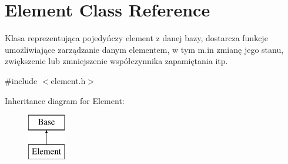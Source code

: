 \hypertarget{class_element}{}\section{Element Class Reference}
\label{class_element}


Klasa reprezentująca pojedyńczy element z danej bazy, dostarcza funkcje umożliwiające zarządzanie danym elementem, w tym m.\+in zmianę jego stanu, zwiększenie lub zmniejszenie współczynnika zapamiętania itp.  




{\ttfamily \#include $<$element.\+h$>$}

Inheritance diagram for Element\+:\begin{figure}[H]
\begin{center}
\leavevmode
\includegraphics[height=2.000000cm]{class_element}
\end{center}
\end{figure}
